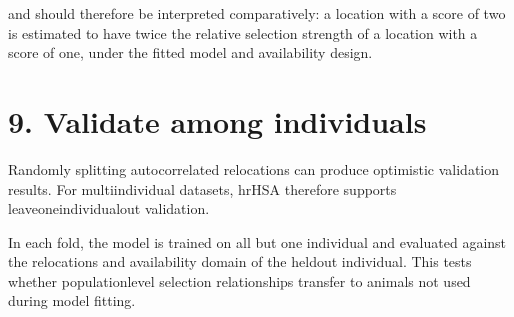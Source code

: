 \documentclass[letterpaper,10pt,english]{sphinxmanual}
\begin{document}
\sphinxAtStartPar
and should therefore be interpreted comparatively: a location with a score of two is estimated to have twice the relative selection strength of a location with a score of one, under the fitted model and availability design.


\section{9. Validate among individuals}
\label{\detokenize{getting_started:validate-among-individuals}}
\sphinxAtStartPar
Randomly splitting autocorrelated relocations can produce optimistic validation results. For multi\sphinxhyphen{}individual datasets, hrHSA therefore supports leave\sphinxhyphen{}one\sphinxhyphen{}individual\sphinxhyphen{}out validation.

\begin{sphinxVerbatim}[commandchars=\\\{\}]
  

\end{sphinxVerbatim}

\sphinxAtStartPar
In each fold, the model is trained on all but one individual and evaluated against the relocations and availability domain of the held\sphinxhyphen{}out individual. This tests whether population\sphinxhyphen{}level selection relationships transfer to animals not used during model fitting.
\end{document}
